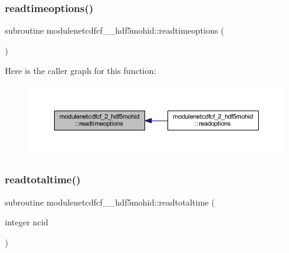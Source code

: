 \subsubsection{\texorpdfstring{readtimeoptions()}{readtimeoptions()}}
{\footnotesize\ttfamily subroutine modulenetcdfcf\+\_\+\_\+hdf5mohid\+::readtimeoptions (\begin{DoxyParamCaption}{ }\end{DoxyParamCaption})\hspace{0.3cm}{\ttfamily [private]}}

Here is the caller graph for this function\+:\nopagebreak
\begin{figure}[H]
\begin{center}
\leavevmode
\includegraphics[width=350pt]{namespacemodulenetcdfcf__2__hdf5mohid_ab249ad2d3a887227db840c6a431fe4a4_icgraph}
\end{center}
\end{figure}
\mbox{\label{namespacemodulenetcdfcf__2__hdf5mohid_acc82dcd56265bba5ab4bdb98fd785e4b}} 
\subsubsection{\texorpdfstring{readtotaltime()}{readtotaltime()}}
{\footnotesize\ttfamily subroutine modulenetcdfcf\+\_\+\_\+hdf5mohid\+::readtotaltime (\begin{DoxyParamCaption}\item[{integer}]{ncid }\end{DoxyParamCaption})\hspace{0.3cm}{\ttfamily [private]}}

